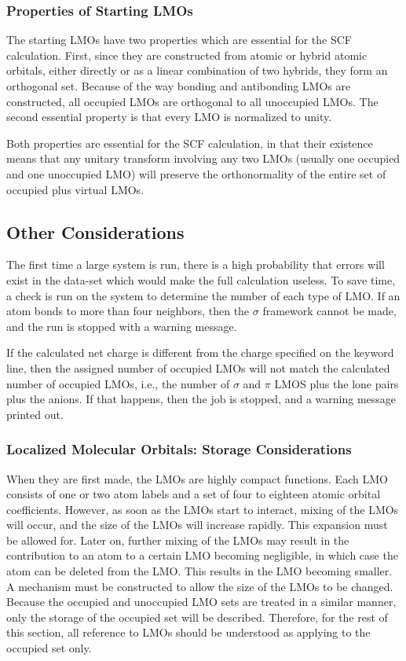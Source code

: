 \subsubsection{Properties of Starting LMOs}
The starting LMOs have two properties which are essential for the SCF
calculation.  First, since they are constructed from atomic or hybrid atomic
orbitals, either directly or as a linear combination of two hybrids, they form
an orthogonal set.  Because of the way bonding and antibonding  LMOs are
constructed, all occupied LMOs are orthogonal to all unoccupied LMOs. The
second essential property is that every LMO is normalized to unity.

Both properties are essential for the SCF calculation, in that their existence
means that any unitary transform involving any two LMOs (usually one occupied
and one unoccupied LMO) will preserve the orthonormality of the entire set of
occupied plus virtual LMOs.

\subsection{Other Considerations}

The first time a large system is run, there is a high probability that  errors
will exist in the data-set which would make the full calculation useless.  To
save time, a check is run on the system to determine the number of each type of
LMO.    If an atom bonds to more than four neighbors, then the $\sigma$
framework cannot be made, and the run is stopped with a warning message.  

If the calculated net charge is different from the charge specified on the
keyword line, then the assigned number of occupied LMOs will not match the
calculated number of occupied LMOs, i.e., the number of  $\sigma$ and $\pi$
LMOS plus the lone pairs plus the anions. If that happens,  then the job is
stopped, and a warning message printed out.



\subsubsection{Localized Molecular Orbitals:  Storage Considerations}
When they are first made, the LMOs are highly compact functions.  Each LMO
consists of one or two atom labels and a set of four to eighteen atomic orbital
coefficients.  However, as soon as the LMOs start to interact,  mixing of the
LMOs will occur, and the size of the LMOs will increase rapidly.  This
expansion must be allowed for.  Later on, further mixing of the LMOs may result
in the contribution to an atom to a certain LMO becoming negligible, in which
case the atom can be deleted from the LMO.    This results in the LMO becoming
smaller.  A mechanism must be constructed to allow the size of the LMOs  to be
changed.  Because the occupied and unoccupied LMO sets are treated in a similar
manner, only the storage of the occupied set will be described. Therefore, for
the rest of this section, all reference to LMOs should be understood as
applying to the occupied  set only.

